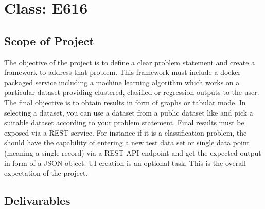\section{Class: E616}\label{s:e616-project}

\subsection{Scope of Project}

The objective of the project is to define a clear problem statement
and create a framework to address that problem. This framework must
include a docker packaged service including a machine learning
algorithm which works on a particular dataset providing clustered,
clasified or regression outputs to the user. The final objective is to
obtain results in form of graphs or tabular mode. In selecting a
dataset, you can use a dataset from a public dataset like
 and pick a suitable
dataset according to your problem statement. Final results must be
exposed via a REST service. For instance if it is a classification
problem, the should have the capability of entering a new test data
set or single data point (meaning a single record) via a REST API endpoint
and get the expected output in form of a JSON object. UI creation is an
optional task. This is the overall expectation of the project. 

\subsection{Delivarables}

